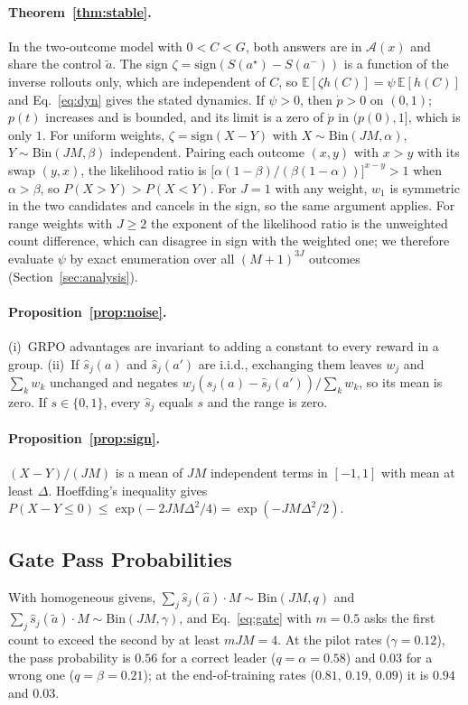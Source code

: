 \documentclass[11pt]{article}
\theoremstyle{remark}
\newcommand{\cA}{\mathcal{A}}
\newcommand{\shat}{\hat{s}}
\newcommand{\astar}{a^{\star}}
\newcommand{\aminus}{a^{-}}
\newcommand{\atilde}{\tilde{a}}
\newcommand{\ahat}{\hat{a}}
\newcommand{\E}{\mathbb{E}}
\begin{document}
\paragraph{Theorem~\ref{thm:stable}.}
In the two-outcome model with $0<C<G$, both answers are in $\cA(x)$ and share the control $\atilde$. The sign $\zeta=\mathrm{sign}(S(\astar)-S(\aminus))$ is a function of the inverse rollouts only, which are independent of $C$, so $\E[\zeta h(C)]=\psi\,\E[h(C)]$ and Eq.~\eqref{eq:dyn} gives the stated dynamics. If $\psi>0$, then $\dot p>0$ on $(0,1)$; $p(t)$ increases and is bounded, and its limit is a zero of $\dot p$ in $(p(0),1]$, which is only $1$. For uniform weights, $\zeta=\mathrm{sign}(X-Y)$ with $X\sim\mathrm{Bin}(JM,\alpha)$, $Y\sim\mathrm{Bin}(JM,\beta)$ independent. Pairing each outcome $(x,y)$ with $x>y$ with its swap $(y,x)$, the likelihood ratio is $\big[\alpha(1-\beta)/(\beta(1-\alpha))\big]^{x-y}>1$ when $\alpha>\beta$, so $P(X>Y)>P(X<Y)$. For $J=1$ with any weight, $w_1$ is symmetric in the two candidates and cancels in the sign, so the same argument applies. For range weights with $J\ge2$ the exponent of the likelihood ratio is the unweighted count difference, which can disagree in sign with the weighted one; we therefore evaluate $\psi$ by exact enumeration over all $(M+1)^{3J}$ outcomes (Section~\ref{sec:analysis}).

\paragraph{Proposition~\ref{prop:noise}.}
(i)~GRPO advantages are invariant to adding a constant to every reward in a group. (ii)~If $\shat_j(a)$ and $\shat_j(a')$ are i.i.d., exchanging them leaves $w_j$ and $\sum_k w_k$ unchanged and negates $w_j(\shat_j(a)-\shat_j(a'))/\sum_k w_k$, so its mean is zero. If $s\in\{0,1\}$, every $\shat_j$ equals $s$ and the range is zero.

\paragraph{Proposition~\ref{prop:sign}.}
$(X-Y)/(JM)$ is a mean of $JM$ independent terms in $[-1,1]$ with mean at least $\Delta$. Hoeffding's inequality gives $P(X-Y\le0)\le\exp\!\big(-2JM\Delta^2/4\big)=\exp(-JM\Delta^2/2)$.

\subsection{Gate Pass Probabilities}
\label{app:gate}
With homogeneous givens, $\sum_j\shat_j(\ahat)\cdot M\sim\mathrm{Bin}(JM,q)$ and $\sum_j\shat_j(\atilde)\cdot M\sim\mathrm{Bin}(JM,\gamma)$, and Eq.~\eqref{eq:gate} with $m=0.5$ asks the first count to exceed the second by at least $mJM=4$. At the pilot rates ($\gamma=0.12$), the pass probability is $0.56$ for a correct leader ($q=\alpha=0.58$) and $0.03$ for a wrong one ($q=\beta=0.21$); at the end-of-training rates ($0.81$, $0.19$, $0.09$) it is $0.94$ and $0.03$.
\end{document}
